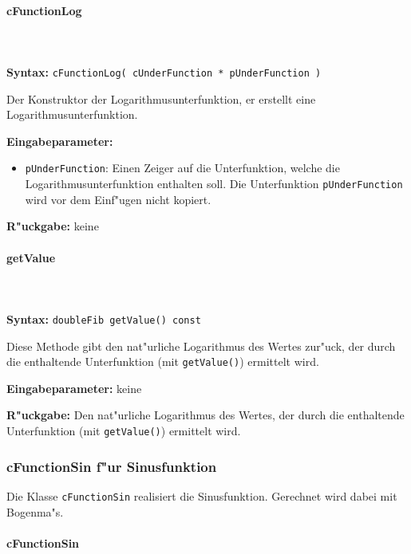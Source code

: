 \paragraph{cFunctionLog}

\ \\\\\noindent
\textbf{Syntax:} \verb|cFunctionLog( cUnderFunction * pUnderFunction )|

\bigskip\noindent
Der Konstruktor der Logarithmusunterfunktion, er erstellt eine Logarithmusunterfunktion.

\bigskip\noindent
\textbf{Eingabeparameter:}
\begin{itemize}
 \item \verb|pUnderFunction|: Einen Zeiger auf die Unterfunktion, welche die Logarithmusunterfunktion enthalten soll. Die Unterfunktion \verb|pUnderFunction| wird vor dem Einf"ugen nicht kopiert.
\end{itemize}

\bigskip\noindent
\textbf{R"uckgabe:} keine


\paragraph{getValue}

\ \\\\\noindent
\textbf{Syntax:} \verb|doubleFib getValue() const|

\bigskip\noindent
Diese Methode gibt den nat"urliche Logarithmus des Wertes zur"uck, der durch die enthaltende Unterfunktion (mit \verb|getValue()|) ermittelt wird.

\bigskip\noindent
\textbf{Eingabeparameter:} keine

\bigskip\noindent
\textbf{R"uckgabe:} Den nat"urliche Logarithmus des Wertes, der durch die enthaltende Unterfunktion (mit \verb|getValue()|) ermittelt wird.


\subsubsection{cFunctionSin f"ur Sinusfunktion}

Die Klasse \verb|cFunctionSin| realisiert die Sinusfunktion. Gerechnet wird dabei mit Bogenma"s.

\paragraph{cFunctionSin}

